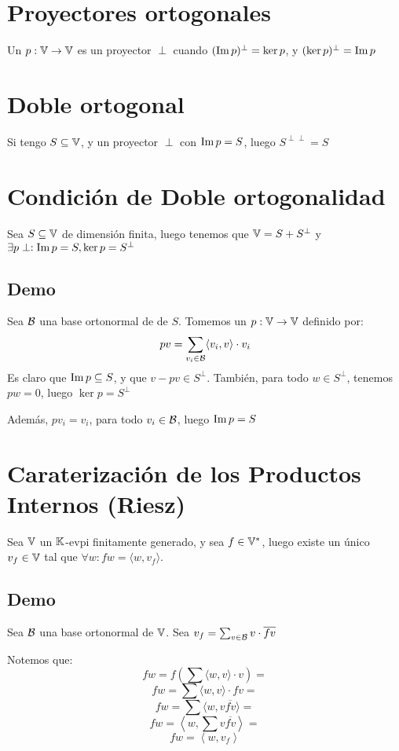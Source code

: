 \documentclass{article}
\begin{document}
\section*{Proyectores ortogonales}
Un $p : \mathbb{V} \to \mathbb{V}$ es un proyector $\perp$ cuando $(\operatorname{Im} p)^\perp = \ker p$, y $(\ker p)^\perp = \operatorname{Im} p$
\section*{Doble ortogonal}
Si tengo $S \subseteq \mathbb{V}$, y un proyector $\perp$ con $\operatorname{Im} p = S$, luego $S^{\perp\perp} = S$
\section*{Condición de Doble ortogonalidad}
Sea $S \subseteq \mathbb{V}$ de dimensión finita, luego tenemos que $\mathbb{V} = S + S^\perp$ y $\exists p\perp : \operatorname{Im} p = S, \ker p = S^\perp$

\subsection*{Demo}
Sea $\mathcal{B}$ una base ortonormal de de $S$. Tomemos un $p : \mathbb{V} \to \mathbb{V}$ definido por:
\[
    pv = \sum_{v_i \in \mathcal{B}} \langle v_i, v \rangle \cdot v_i
\]
Es claro que $\operatorname{Im} p \subseteq S$, y que $v - pv \in S^\perp$. También, para todo $w \in S^\perp$, tenemos $pw = 0$, luego $\ker p = S^\perp$

Además, $pv_i = v_i$, para todo $v_i \in \mathcal{B}$, luego $\operatorname{Im} p = S$

\section*{Caraterización de los Productos Internos (Riesz)}
Sea $\mathbb{V}$ un $\mathbb{K}$-evpi finitamente generado, y sea $f \in \mathbb{V}^*$, luego existe un único $v_f \in \mathbb{V}$ tal que $\forall w : fw = \langle w, v_f \rangle$.

\subsection*{Demo}
Sea $\mathcal{B}$ una base ortonormal de $\mathbb{V}$. Sea $v_f = \sum_{v \in \mathcal{B}} v \cdot \overline{fv}$

Notemos que:
\[
    fw = f \left(\sum \langle w, v \rangle \cdot v\right) =
\]
\[
    fw = \sum \langle w, v \rangle \cdot fv=
\]
\[
    fw = \sum \langle w, v\overline{fv} \rangle =
\]
\[
    fw = \left\langle w, \sum v\overline{fv} \right\rangle =
\]
\[
    fw = \left\langle w, v_f\right\rangle
\]
\end{document}
